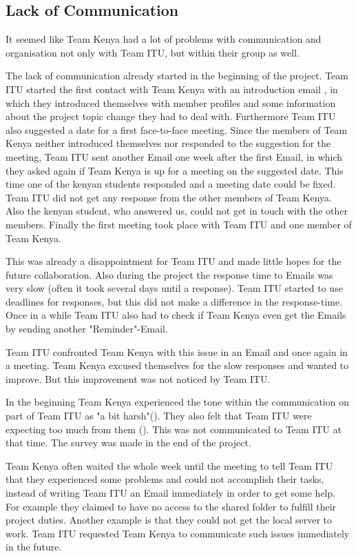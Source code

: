 \subsection{Lack of Communication}
It seemed like Team Kenya had a lot of problems with communication and organisation not only with Team ITU, but within their group as well.

The lack of communication already started in the beginning of the project. Team ITU started the first contact with Team Kenya with an introduction email , in which they introduced themselves with member profiles and some information about the project topic change they had to deal with. Furthermore Team ITU also suggested a date for a first face-to-face meeting. Since the members of Team Kenya neither introduced themselves nor responded to the suggestion for the meeting, Team ITU sent another Email one week after the first Email, in which they asked again if Team Kenya is up for a meeting on the suggested date. This time one of the kenyan students responded and a meeting date could be fixed. Team ITU did not get any response from the other members of Team Kenya. Also the kenyan student, who answered us, could not get in touch with the other members. Finally the first meeting took place with Team ITU and one member of Team Kenya.

This was already a disappointment for Team ITU and made little hopes for the future collaboration. Also during the project the response time to Emails was very slow (often it took several days until a response). Team ITU started to use deadlines for responses, but this did not make a difference in the response-time. Once in a while Team ITU also had to check if Team Kenya even get the Emails by sending another "Reminder"-Email.

Team ITU confronted Team Kenya with this issue in an Email and once again in a meeting. Team Kenya excused themselves for the slow responses and wanted to improve. But this improvement was not noticed by Team ITU.

In the beginning Team Kenya experienced the tone within the communication on part of Team ITU  as "a bit harsh"(). They also felt that Team ITU were expecting too much from them (). This was not communicated to Team ITU at that time. The survey was made in the end of the project. 

Team Kenya often waited the whole week until the meeting to tell Team ITU that they experienced some problems and could not accomplish their tasks, instead of writing Team ITU an Email immediately in order to get some help. For example they claimed to have no access to the shared folder to fulfill their project duties. Another example is that they could not get the local server to work. Team ITU requested Team Kenya to communicate such issues immediately in the future.

